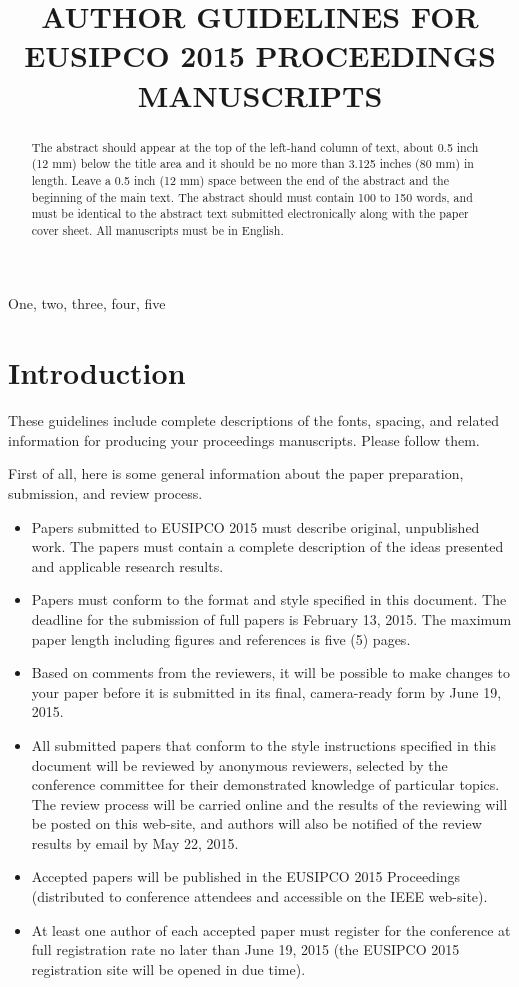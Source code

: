 \documentclass[a4paper]{article}
\title{AUTHOR GUIDELINES FOR EUSIPCO 2015 PROCEEDINGS MANUSCRIPTS}
\begin{document}
%
\maketitle
%
\begin{abstract}
The abstract should appear at the top of the left-hand column of text, about
0.5 inch (12 mm) below the title area and it should be no more than 3.125 inches (80 mm) in
length.  Leave a 0.5 inch (12 mm) space between the end of the abstract and the
beginning of the main text.  The abstract should must contain 100 to 150
words, and must be identical to the abstract text submitted electronically
along with the paper cover sheet.  All manuscripts must be in English.
\end{abstract}
%
\begin{keywords}
One, two, three, four, five
\end{keywords}
%
\section{Introduction}
\label{sec:intro}

These guidelines include complete descriptions of the fonts, spacing, and
related information for producing your proceedings manuscripts. Please follow
them.

First of all, here is some general information about the paper preparation, submission, and review process.

\begin{itemize}
  \item Papers submitted to EUSIPCO 2015 must describe original, unpublished work. The papers must contain a complete description of the ideas presented and applicable research results.
  \item Papers must conform to the format and style specified in this document. The deadline for the submission of full papers is February 13, 2015. The maximum paper length including figures and references is five (5) pages.
  \item Based on comments from the reviewers, it will be possible to make changes to your paper before it is submitted in its final, camera-ready form by June 19, 2015.
  \item All submitted papers that conform to the style instructions specified in this document will be reviewed by anonymous reviewers, selected by the conference committee for their demonstrated knowledge of particular topics. The review process will be carried online and the results of the reviewing will be posted on this web-site, and authors will also be notified of the review results by email by May 22, 2015.
  \item Accepted papers will be published in the EUSIPCO 2015 Proceedings (distributed to conference attendees and accessible on the IEEE web-site).
  \item At least one author of each accepted paper must register for the conference at full registration rate no later than June 19, 2015 (the EUSIPCO 2015 registration site will be opened in due time).
\end{itemize}
\end{document}
